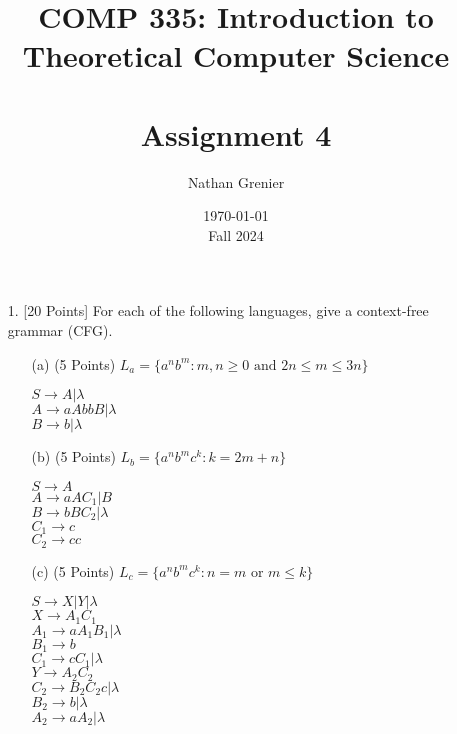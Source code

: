 \documentclass[12pt]{article}
\title{COMP 335: Introduction to Theoretical Computer Science\\
\ \\
Assignment 4}
\author{Nathan Grenier}
\date{\today \\ Fall 2024}
\begin{document}
\begin{spacing}{1.5}
      \maketitle

      \newpage

      \begin{enumerate}

            \item[1.] [20 Points] For each of the following languages, give a context-free grammar (CFG).

                  \begin{enumerate}
                        \item[(a)] (5 Points) $L_a = \{a^nb^m : m,n \geq 0 \text{ and } 2n \leq m \leq 3n \}$

                              $S \rightarrow A | \lambda$ \\
                              $A \rightarrow aAbbB | \lambda$ \\
                              $B \rightarrow b | \lambda$

                        \item[(b)] (5 Points) $L_b = \{a^nb^mc^k : k=2m+n \}$

                              $S \rightarrow A $ \\
                              $A \rightarrow aAC_1 | B$ \\
                              $B \rightarrow bBC_2 | \lambda$ \\
                              $C_1 \rightarrow c$ \\
                              $C_2 \rightarrow cc$

                        \item[(c)] (5 Points) $L_c = \{a^nb^mc^k : n=m \text{ or } m \leq k \}$

                              $S \rightarrow X | Y | \lambda$ \\
                              $X \rightarrow A_1C_1$ \\
                              $A_1 \rightarrow aA_1B_1 | \lambda$ \\
                              $B_1 \rightarrow b$ \\
                              $C_1 \rightarrow cC_1 | \lambda$ \\
                              $Y \rightarrow A_2C_2$ \\
                              $C_2 \rightarrow B_2C_2c | \lambda$ \\
                              $B_2 \rightarrow b | \lambda$ \\
                              $A_2 \rightarrow aA_2 | \lambda$


\end{enumerate}
\end{enumerate}
\end{spacing}
\end{document}

